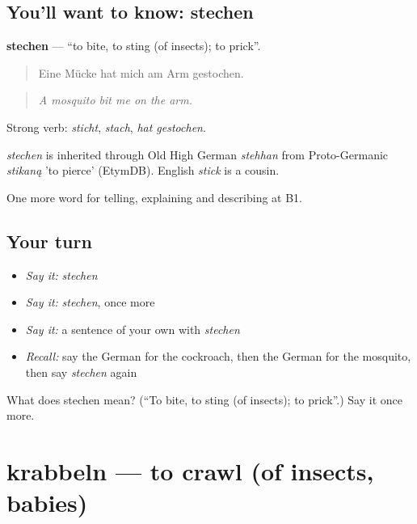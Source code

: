 \subsection*{You'll want to know: stechen}
\textbf{stechen} — \textquotedblleft{}to bite, to sting (of insects); to prick\textquotedblright{}.

\begin{quote}
Eine Mücke hat mich am Arm gestochen.
\end{quote}

\begin{quote}
\emph{A mosquito bit me on the arm.}
\end{quote}

Strong verb: \emph{sticht}, \emph{stach}, \emph{hat gestochen}.

\begin{cousinweb}
\emph{stechen} is inherited through Old High German \emph{stehhan} from Proto-Germanic \emph{stikaną} 'to pierce' (EtymDB). English \emph{stick} is a cousin.
\end{cousinweb}

\begin{grammarlens}[title={What you've built}]
One more word for telling, explaining and describing at B1.
\end{grammarlens}

\subsection*{Your turn}
\begin{itemize}
\raggedright
  \item \emph{Say it:} \emph{stechen}
  \item \emph{Say it:} \emph{stechen}, once more
  \item \emph{Say it:} a sentence of your own with \emph{stechen}
  \item \emph{Recall:} say the German for the cockroach, then the German for the mosquito, then say \emph{stechen} again
\end{itemize}

\begin{tcolorbox}[breakable,colback=teal!4,colframe=teal!35!black,title={Before you move on}]
What does stechen mean? (\textquotedblleft{}To bite, to sting (of insects); to prick\textquotedblright{}.) Say it once more.
\end{tcolorbox}
\section[krabbeln]{krabbeln — to crawl (of insects, babies)}

